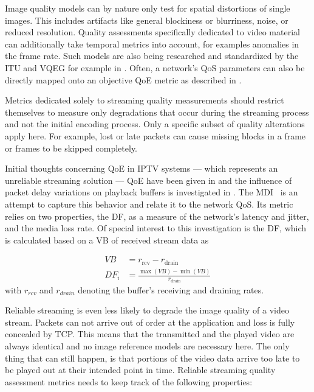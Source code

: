Image quality models can by nature only test for spatial distortions of single images. This includes artifacts like general blockiness or blurriness, noise, or reduced resolution. Quality assessments specifically dedicated to video material can additionally take temporal metrics into account, for examples anomalies in the frame rate. Such models are also being researched and standardized by the \gls{ITU} and \gls{VQEG} for example in \cite{ituJ144, ituJ246, ituJ247}. Often, a network's \gls{QoS} parameters can also be directly mapped onto an objective \gls{QoE} metric as described in \cite{5430142}.

Metrics dedicated solely to streaming quality measurements should restrict themselves to measure only degradations that occur during the streaming process and not the initial encoding process. Only a specific subset of quality alterations apply here. For example, lost or late packets can cause missing blocks in a frame or frames to be skipped completely. 

Initial thoughts concerning \acrshort{QoE} in \gls{IPTV} systems --- which represents an unreliable streaming solution --- \gls{QoE} have been given in \cite{ituG1080} and the influence of packet delay variations on playback buffers is investigated in \cite{rfc3393}. The \gls{MDI}~\cite{rfc4445} is an attempt to capture this behavior and relate it to the network \gls{QoS}. Its metric relies on two properties, the \gls{DF}, as a measure of the network's latency and jitter, and the media loss rate. Of special interest to this investigation is the \gls{DF}, which is calculated based on a \gls{VB} of received stream data as


\begin{align}
	VB &= r_{\text{rcv}} - r_{\text{drain}} \\
	DF_i &= \frac{\max(VB) - \min(VB)}{r_{\text{drain}}}
\end{align}
%
with $r_{rcv}$ and $r_{drain}$ denoting the buffer's receiving and draining rates.

Reliable streaming is even less likely to degrade the image quality of a video stream. Packets can not arrive out of order at the application and loss is fully concealed by \gls{TCP}. This means that the transmitted and the played video are always identical and no image reference models are necessary here. The only thing that can still happen, is that portions of the video data arrive too late to be played out at their intended point in time. Reliable streaming quality assessment metrics needs to keep track of the following properties:

